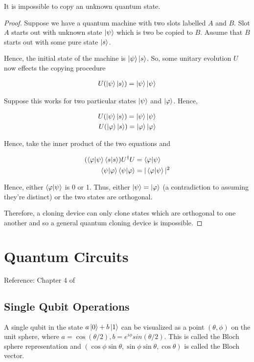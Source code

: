 \documentclass[main.tex]{subfiles}
\begin{document}
\begin{subappendices}
It is impossible to copy an unknown quantum state.

\begin{proof}
Suppose we have a quantum machine with two slots labelled $A$ and $B$. Slot $A$ starts out with unknown state $\ket{\psi}$ which is two be copied to $B$. Assume that $B$ starts out with some pure state $\ket{s}$.

Hence, the initial state of the machine is $\ket{\psi}\ket{s}$. So, some unitary evolution $U$ now effects the copying procedure

\begin{align*}
	U(\ket{\psi}\ket{s}) = \ket{\psi}\ket{\psi}
\end{align*}
	
	Suppose this works for two particular states $\ket{\psi}$ and $\ket{\varphi}$. Hence,
	
	\begin{align*}
		U(\ket{\psi}\ket{s}) = \ket{\psi}\ket{\psi} \\
		U(\ket{\varphi}\ket{s}) = \ket{\varphi}\ket{\varphi}
	\end{align*}
	
	Hence, take the inner product of the two equations and 
	
	\begin{align*}
		(\bra{\varphi}\ket{\psi}\bra{s}\ket{s})U^\dag U &= \bra{\varphi}\ket{\psi} \\
		\bra{\psi}\ket{\varphi}\bra{\psi}\ket{\varphi} &= |\bra{\varphi}\ket{\psi}|^2
	\end{align*}
	
	Hence, either $\bra{\varphi}\ket{\psi}$ is 0 or 1. Thus, either $\ket{\psi} = \ket{\varphi}$ (a contradiction to assuming they're distinct) or the two states are orthogonal.
	
	Therefore, a cloning device can only clone states which are orthogonal to one another and so a general quantum cloning device is impossible.  
\end{proof}

\section{Quantum Circuits}
Reference: Chapter 4 of \cite{nielsen2010quantum}

\subsection{Single Qubit Operations}

A single qubit in the state $a \ket{0} + b \ket{1}$ can be visualized as a point $(\theta, \phi)$ on the unit sphere, where $a = \cos(\theta / 2), b = e^{i\phi}sin(\theta / 2)$. This is called the Bloch sphere representation and $(\cos \phi \sin \theta , \sin \phi \sin \theta, \cos \theta)$ is called the Bloch vector. 


\end{subappendices}
\end{document}
